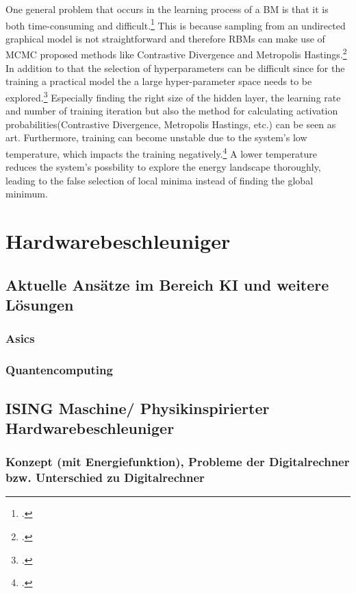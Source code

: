 One general problem that occurs in the learning process of a \ac{BM} is that it is both time-consuming and difficult.\footcite[Vgl.][1-2]{fischerIntroductionRestrictedBoltzmann2012}
This is because sampling from an undirected graphical model is not straightforward and therefore \ac{RBM}s can make use
of \ac{MCMC} proposed methods like Contrastive Divergence and Metropolis Hastings.\footcite[Vgl.][2]{fischerIntroductionRestrictedBoltzmann2012}
In addition to that the selection of hyperparameters can be difficult since for the training a practical model the a large hyper-parameter space needs to be explored.\footcite[Vgl.][536]{larochelleClassificationUsingDiscriminative2008}
Especially finding the right size of the hidden layer, the learning rate and number of training iteration but also the method for calculating activation probabilities(Contrastive Divergence, Metropolis Hastings, etc.) can be seen as art.
Furthermore, training can become unstable due to the system's low temperature, which impacts the training negatively.\footcite[Vgl.][3-4]{huembeliPhysicsEnergybasedModels2022}
A lower temperature reduces the system's possbility to explore the energy landscape thoroughly, leading to the false selection of local minima instead of finding the global minimum.

\section{Hardwarebeschleuniger}
\subsection{Aktuelle Ansätze im Bereich KI und weitere Lösungen}
\subsubsection{Asics}
\subsubsection{Quantencomputing}
\subsection{ISING Maschine/ Physikinspirierter Hardwarebeschleuniger}
\subsubsection{Konzept (mit Energiefunktion), Probleme der Digitalrechner bzw. Unterschied zu Digitalrechner}
